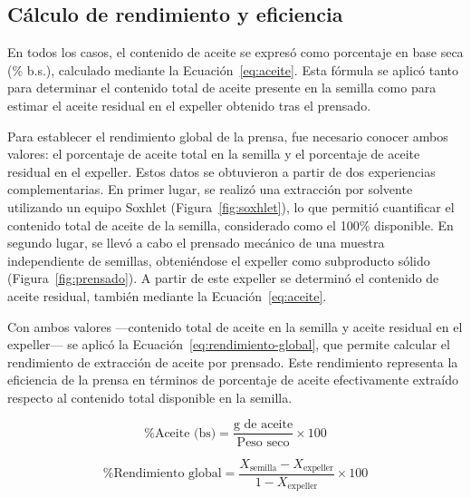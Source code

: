 \documentclass[12pt,a4paper]{article}
\begin{document}
\subsection{Cálculo de rendimiento y eficiencia}

En todos los casos, el contenido de aceite se expresó como porcentaje en base seca (\% b.s.), calculado mediante la Ecuación~\ref{eq:aceite}. Esta fórmula se aplicó tanto para determinar el contenido total de aceite presente en la semilla como para estimar el aceite residual en el expeller obtenido tras el prensado.

Para establecer el rendimiento global de la prensa, fue necesario conocer ambos valores: el porcentaje de aceite total en la semilla y el porcentaje de aceite residual en el expeller. Estos datos se obtuvieron a partir de dos experiencias complementarias. En primer lugar, se realizó una extracción por solvente utilizando un equipo Soxhlet (Figura~\ref{fig:soxhlet}), lo que permitió cuantificar el contenido total de aceite de la semilla, considerado como el 100\% disponible. En segundo lugar, se llevó a cabo el prensado mecánico de una muestra independiente de semillas, obteniéndose el expeller como subproducto sólido (Figura~\ref{fig:prensado}). A partir de este expeller se determinó el contenido de aceite residual, también mediante la Ecuación~\ref{eq:aceite}.

Con ambos valores —contenido total de aceite en la semilla y aceite residual en el expeller— se aplicó la Ecuación~\ref{eq:rendimiento-global}, que permite calcular el rendimiento de extracción de aceite por prensado. Este rendimiento representa la eficiencia de la prensa en términos de porcentaje de aceite efectivamente extraído respecto al contenido total disponible en la semilla.

\begin{equation}
\% \text{Aceite (bs)} = \frac{\text{g de aceite}}{\text{Peso seco}} \times 100
\label{eq:aceite}
\end{equation}

\begin{equation}
\% \text{Rendimiento global} = \frac{X_{\text{semilla}} - X_{\text{expeller}}}{1 - X_{\text{expeller}}} \times 100
\label{eq:rendimiento-global}
\end{equation}

\end{document}
